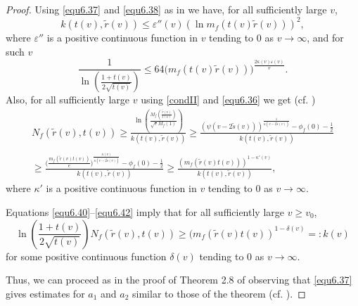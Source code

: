\documentclass[11pt, oneside]{amsart}
\begin{document}
\begin{proof}
Using \eqref{equ6.37} and \eqref{equ6.38} as in \cite[Lm.\,8.5]{B} we have, for all sufficiently large $v$,
\begin{equation}\label{equ6.40}
k(t(v),\tilde r(v))\leq\varepsilon''(v)(\ln m_f(t(v)\tilde r(v)))^2,
\end{equation}
where $\varepsilon''$ is a positive continuous function in $v$ tending to $0$ as $v\rightarrow\infty$, and for such $v$
\begin{equation}\label{equ6.41}
\frac{1}{\ln\left(\frac{1+t(v)}{2\sqrt{t(v)}}\right)}\le 64 \bigl(m_f(t(v)\tilde r(v))\bigr)^{\frac{2\kappa(v)\varepsilon(v)}{v}}.
\end{equation}
Also, for all sufficiently large $v$ using \eqref{condII} and \eqref{equ6.36} we get
(cf. \cite[Eq.\,(8.32)]{B})
\begin{equation}\label{equ6.42}
\begin{array}{l}
\displaystyle
N_f(\tilde r(v), t(v))\ge \frac{\ln\left(\frac{ M_f\left(\frac{\tilde r(v)}{t(v)}\right)}{\sqrt{e}M_f(1)}\right)}{k(t(v),\tilde r(v))}\ge \frac{\left(\psi(v-2\tilde s(v))\right)^{\frac{1}{\kappa(v-2\tilde s(v))}}-\phi_f(0)-\frac 12}{k(t(v),\tilde r(v))}\\
\\
\displaystyle\ge \frac{\bigl(\frac{m_f(\tilde r(v)t(v))}{e}\bigr)^{\frac{\kappa(v)}{\kappa(v-2\tilde s(v))}}-\phi_f(0)-\frac 12}{k(t(v),\tilde r(v))}\ge \frac{(m_f(\tilde r(v)t(v)))^{1-\kappa'(v)}}{k(t(v),\tilde r(v))}, 
\end{array}
\end{equation}
where $\kappa'$ is a positive continuous function in $v$ tending to $0$ as $v\rightarrow\infty$.

Equations \eqref{equ6.40}--\eqref{equ6.42} imply that for all sufficiently large $v\ge v_0$,
\[   
\ln\left(\frac{1+t(v)}{2\sqrt{t(v)}}\right)N_f(\tilde r(v),t(v))\ge (m_f(\tilde r(v)t(v))^{1-\delta(v)}=:k(v)
\]
for some positive continuous function $\delta(v)$ tending to $0$ as $v\rightarrow\infty$. 

Thus, we can proceed as in the proof of Theorem 2.8  of \cite{B} observing that \eqref{equ6.37} gives estimates for $a_1$ and $a_2$ similar to those of the theorem  (cf. \cite[Eq.\,(8.29)]{B}).
\end{proof}
\end{document}

